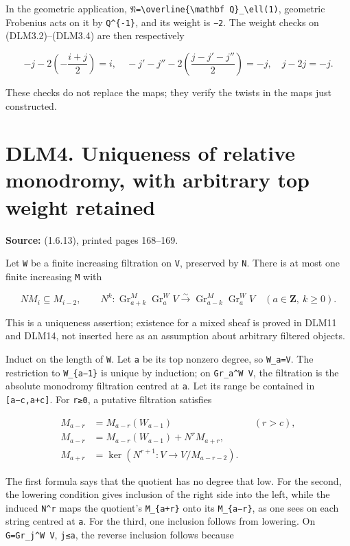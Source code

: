 \documentclass[
]{report}
\begin{document}
In the geometric application,
\texttt{𝔑=\textbackslash{}overline\{\textbackslash{}mathbf\ Q\}\_\textbackslash{}ell(1)},
geometric Frobenius acts on it by \texttt{Q\^{}\{-1\}}, and its weight
is \texttt{−2}. The weight checks on (DLM3.2)--(DLM3.4) are then
respectively

\[
-j-2\left(-\frac{i+j}{2}\right)=i,
\quad
-j'-j''-2\left(\frac{j-j'-j''}{2}\right)=-j,
\quad j-2j=-j.
\]

These checks do not replace the maps; they verify the twists in the maps
just constructed.

\section{DLM4. Uniqueness of relative monodromy, with arbitrary top
weight
retained}\label{dlm4.-uniqueness-of-relative-monodromy-with-arbitrary-top-weight-retained}

\textbf{Source:} (1.6.13), printed pages 168--169.

Let \texttt{W} be a finite increasing filtration on \texttt{V},
preserved by \texttt{N}. There is at most one finite increasing
\texttt{M} with

\[
NM_i\subseteq M_{i-2},\qquad
N^k:\operatorname{Gr}_{a+k}^M\operatorname{Gr}_a^W V
\xrightarrow{\sim}\operatorname{Gr}_{a-k}^M\operatorname{Gr}_a^W V
\quad(a\in\mathbf Z,\ k\ge0).
\tag{DLM4.1}
\]

This is a uniqueness assertion; existence for a mixed sheaf is proved in
DLM11 and DLM14, not inserted here as an assumption about arbitrary
filtered objects.

Induct on the length of \texttt{W}. Let \texttt{a} be its top nonzero
degree, so \texttt{W\_a=V}. The restriction to \texttt{W\_\{a−1\}} is
unique by induction; on \texttt{Gr\_a\^{}W\ V}, the filtration is the
absolute monodromy filtration centred at \texttt{a}. Let its range be
contained in \texttt{{[}a−c,a+c{]}}. For \texttt{r≥0}, a putative
filtration satisfies

\[
\begin{aligned}
M_{a-r}&=M_{a-r}(W_{a-1}) &&(r>c),\\
M_{a-r}&=M_{a-r}(W_{a-1})+N^rM_{a+r},\\
M_{a+r}&=\ker\left(N^{r+1}:V\longrightarrow V/M_{a-r-2}\right).
\end{aligned}
\tag{DLM4.2}
\]

The first formula says that the quotient has no degree that low. For the
second, the lowering condition gives inclusion of the right side into
the left, while the induced \texttt{N\^{}r} maps the quotient's
\texttt{M\_\{a+r\}} onto its \texttt{M\_\{a−r\}}, as one sees on each
string centred at \texttt{a}. For the third, one inclusion follows from
lowering. On \texttt{G=Gr\_j\^{}W\ V}, \texttt{j≤a}, the reverse
inclusion follows because
\end{document}
